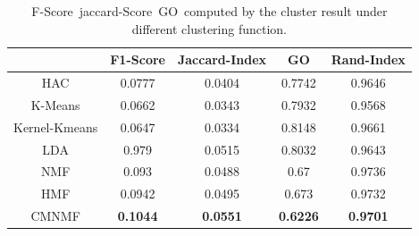 \documentclass{bmcart}
\begin{document}
\begin{table}[!t]\label{tab:F1}
\centering
\caption{F-Score\ jaccard-Score\ GO\ computed by the cluster result under different clustering function.}
\label{tab:go}
\begin{tabular}{|c||c|c|c|c|}
\hline
&F1-Score &Jaccard-Index& GO&Rand-Index\\
\hline
\hline
HAC&0.0777&0.0404&0.7742&0.9646\\
\hline
K-Means&0.0662  & 0.0343& 0.7932&0.9568\\
\hline
Kernel-Kmeans&0.0647&0.0334&0.8148&0.9661\\
\hline
LDA&0.979&0.0515&0.8032&0.9643\\
\hline
NMF&0.093&0.0488&0.67&0.9736\\
\hline
HMF&0.0942&0.0495&0.673&0.9732\\
\hline
CMNMF&\textbf{0.1044}& \textbf{0.0551}& \textbf{0.6226}&\textbf{0.9701}\\
\hline
\end{tabular}
\end{table}
\end{document}
